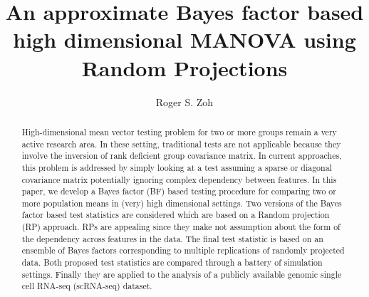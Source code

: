 \documentclass[12pt]{article}
\title{An approximate Bayes factor based high dimensional MANOVA using Random Projections}
\author{Roger S. Zoh}
\theoremstyle{plain}%
\theoremstyle{definition}
\begin{document}
	\maketitle







\begin{abstract}
High-dimensional mean vector testing problem for two or more groups remain a very active research area. In these setting, traditional tests are not applicable because they involve the inversion of rank deficient group covariance matrix. In current approaches, this problem is addressed by simply looking at a test assuming a sparse or diagonal covariance matrix potentially ignoring complex dependency between features.
In this paper, we develop a Bayes factor (BF) based testing procedure for comparing two or more population means in (very) high dimensional settings. Two versions of the Bayes factor based test statistics are considered which are based on a Random projection (RP) approach. RPs are appealing since they make not assumption about the form of the dependency across features in the data. The final test statistic is based on an ensemble of Bayes factors corresponding to multiple replications of randomly projected data. Both proposed test statistics are compared through a battery of simulation settings. Finally they are applied to the analysis of a publicly available genomic single cell RNA-seq (scRNA-seq) dataset. 
\end{abstract}

\end{document}
